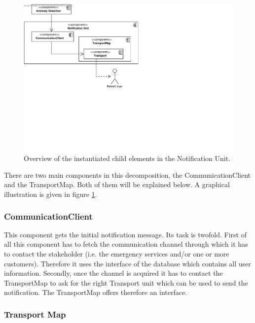 \begin{figure}[H]
	\begin{centering}
		\includegraphics[width=\textwidth]{figs/add-it8-elements.pdf}
		\caption{Overview of the instantiated child elements in the Notification
		Unit.}
		\label{fig:it8/elements}
	\end{centering}
\end{figure}

\npar There are two main components in this decomposition, the
CommunicationClient and the TransportMap. Both of them will be explained below.
A graphical illustration is given in figure \ref{fig:it8/elements}.

\subsubsection{CommunicationClient} 

\npar This component gets the initial notification message. Its task is
twofold. First of all this component has to fetch the communication channel
through which it has to contact the stakeholder (i.e. the emergency services
and/or one or more customers). Therefore it uses the
 interface of the database which contains all user
information. Secondly, once the channel is acquired it has to contact the
TransportMap to ask for the right Transport unit which can be used to send the
notification. The TransportMap offers therefore an 
interface.

\subsubsection{Transport Map}

